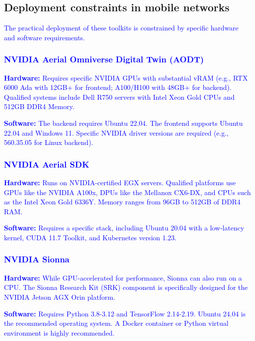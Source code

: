 \documentclass[conference]{IEEEtran}
\begin{document}
\subsection{Deployment constraints in mobile networks}

\textcolor{blue}{The practical deployment of these toolkits is constrained by specific hardware and software requirements.}

\textcolor{blue}{\subsubsection{NVIDIA Aerial Omniverse Digital Twin (AODT)}}

\textcolor{blue}{\textbf{Hardware:} Requires specific NVIDIA GPUs with substantial vRAM (e.g., RTX 6000 Ada with 12GB+ for frontend; A100/H100 with 48GB+ for backend). Qualified systems include Dell R750 servers with Intel Xeon Gold CPUs and 512GB DDR4 Memory.}

\textcolor{blue}{\textbf{Software:} The backend requires Ubuntu 22.04. The frontend supports Ubuntu 22.04 and Windows 11. Specific NVIDIA driver versions are required (e.g., 560.35.05 for Linux backend).}

\textcolor{blue}{\subsubsection{NVIDIA Aerial SDK}}

\textcolor{blue}{\textbf{Hardware:} Runs on NVIDIA-certified EGX servers. Qualified platforms use GPUs like the NVIDIA A100x, DPUs like the Mellanox CX6-DX, and CPUs such as the Intel Xeon Gold 6336Y. Memory ranges from 96GB to 512GB of DDR4 RAM.}

\textcolor{blue}{\textbf{Software:} Requires a specific stack, including Ubuntu 20.04 with a low-latency kernel, CUDA 11.7 Toolkit, and Kubernetes version 1.23.}

\textcolor{blue}{\subsubsection{NVIDIA Sionna}}

\textcolor{blue}{\textbf{Hardware:} While GPU-accelerated for performance, Sionna can also run on a CPU. The Sionna Research Kit (SRK) component is specifically designed for the NVIDIA Jetson AGX Orin platform.}

\textcolor{blue}{\textbf{Software:} Requires Python 3.8-3.12 and TensorFlow 2.14-2.19. Ubuntu 24.04 is the recommended operating system. A Docker container or Python virtual environment is highly recommended.}
\end{document}
